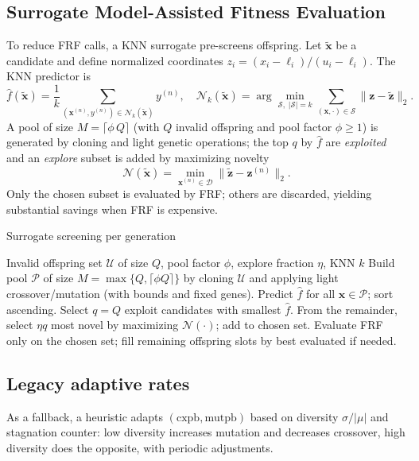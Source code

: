 \documentclass[12pt,a4paper]{article}
\begin{document}
    \subsection{Surrogate Model-Assisted Fitness Evaluation}
    To reduce FRF calls, a KNN surrogate pre-screens offspring. Let $\tilde{\mathbf{x}}$ be a candidate and define normalized coordinates $z_i=(x_i-\ell_i)/(u_i-\ell_i)$. The KNN predictor is
    \begin{equation}
        \hat f(\tilde{\mathbf{x}})= \frac{1}{k}\sum_{(\mathbf{x}^{(n)},y^{(n)})\in\mathcal{N}_k(\tilde{\mathbf{x}})} y^{(n)},\quad \mathcal{N}_k(\tilde{\mathbf{x}})=\arg\min_{\mathcal{S},\;|\mathcal{S}|=k}\sum_{(\mathbf{x},\cdot)\in\mathcal{S}}\lVert \mathbf{z}-\tilde{\mathbf{z}}\rVert_2.
    \end{equation}
    A pool of size $M=\lceil \phi\,Q\rceil$ (with $Q$ invalid offspring and pool factor $\phi\ge1$) is generated by cloning and light genetic operations; the top $q$ by $\hat f$ are \emph{exploited} and an \emph{explore} subset is added by maximizing novelty
    \begin{equation}
        \mathcal{N}(\tilde{\mathbf{x}})=\min_{\mathbf{x}^{(n)}\in\mathcal{D}}\lVert \tilde{\mathbf{z}}-\mathbf{z}^{(n)}\rVert_2.
    \end{equation}
    Only the chosen subset is evaluated by FRF; others are discarded, yielding substantial savings when FRF is expensive.

    \begin{algorithm}[H]
    \caption{Surrogate screening per generation}
    \begin{algorithmic}[1]
    \REQUIRE Invalid offspring set $\mathcal{U}$ of size $Q$, pool factor $\phi$, explore fraction $\eta$, KNN $k$
    \STATE Build pool $\mathcal{P}$ of size $M=\max\{Q,\lceil\phi Q\rceil\}$ by cloning $\mathcal{U}$ and applying light crossover/mutation (with bounds and fixed genes).
    \STATE Predict $\hat f$ for all $\mathbf{x}\in\mathcal{P}$; sort ascending.
    \STATE Select $q=Q$ exploit candidates with smallest $\hat f$.
    \STATE From the remainder, select $\eta q$ most novel by maximizing $\mathcal{N}(\cdot)$; add to chosen set.
    \STATE Evaluate FRF only on the chosen set; fill remaining offspring slots by best evaluated if needed.
    \end{algorithmic}
    \end{algorithm}

    \subsection{Legacy adaptive rates}
    As a fallback, a heuristic adapts $(\text{cxpb},\text{mutpb})$ based on diversity $\sigma/|\mu|$ and stagnation counter: low diversity increases mutation and decreases crossover, high diversity does the opposite, with periodic adjustments.
\end{document}
